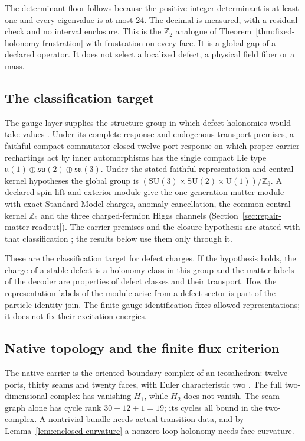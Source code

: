 \documentclass[11pt]{article}
\newcommand{\SU}{\mathrm{SU}}
\newcommand{\U}{\mathrm{U}}
\begin{document}
The determinant floor follows because the positive integer determinant is
at least one and every eigenvalue is at most 24. The decimal is measured,
with a residual check and no interval enclosure. This is the
\(\mathbb Z_2\) analogue of Theorem~\ref{thm:fixed-holonomy-frustration}
with frustration on every face. It is a global gap of a declared operator.
It does not select a localized defect, a physical field fiber or a mass.

\subsection{The classification target}

The gauge layer supplies the structure group in which defect holonomies
would take values \cite{ophGauge}. Under its complete-response and
endogenous-transport premises, a faithful compact commutator-closed
twelve-port response on which proper carrier rechartings act by inner
automorphisms has the single compact Lie type
\(\mathfrak u(1)\oplus\mathfrak{su}(2)\oplus\mathfrak{su}(3)\). Under the
stated faithful-representation and central-kernel hypotheses the global
group is \((\SU(3)\times\SU(2)\times\U(1))/\mathbb Z_6\). A declared spin lift
and exterior module give the one-generation matter module with exact
Standard Model charges, anomaly cancellation, the common central kernel
\(\mathbb Z_6\) and the three charged-fermion Higgs channels
(Section~\ref{sec:repair-matter-readout}). The carrier premises and the
closure hypothesis are stated with that classification \cite{ophGauge}; the
results below use them only through it.

These are the classification target for defect charges. If the hypothesis
holds, the charge of a stable defect is a holonomy class in this group and
the matter labels of the decoder are properties of defect classes and their
transport. How the representation labels of the module arise from a defect
sector is part of the particle-identity join. The finite gauge
identification fixes allowed representations; it does not fix their
excitation energies.

\subsection{Native topology and the finite flux criterion}

The native carrier is the oriented boundary complex of an icosahedron:
twelve ports, thirty seams and twenty faces, with Euler characteristic two
\cite{ophmicrophysics}.
The full two-dimensional complex has vanishing \(H_1\), while \(H_2\) does
not vanish. The seam graph alone has cycle rank
\(30-12+1=19\); its cycles all bound in the two-complex. A nontrivial bundle
needs actual transition data, and by Lemma~\ref{lem:enclosed-curvature} a
nonzero loop holonomy needs face curvature.
\end{document}
